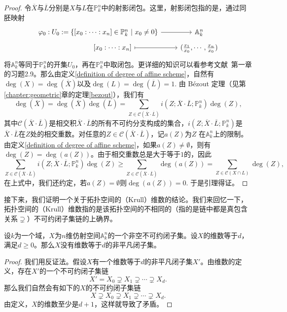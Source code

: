 \begin{proof}
令$\overline{X}$与$\overline{L}$分别是$X$与$L$在$\mathbb{P}^n_k$中的射影闭包。这里，射影闭包指的是，通过同胚映射
\[
\begin{tikzcd}[row sep = tiny]
\varphi_0: U_0 := \left\{ [x_0:\cdots:x_n] \in \mathbb{P}^n_k \ \middle|\ x_0\neq 0 \right\} \arrow[r] & \mathbb{A}^n_k \\
\phantom{hehehehe} [x_0:\cdots:x_n] \arrow[r, mapsto] & (\frac{x_1}{x_0},\cdots,\frac{x_n}{x_0})
\end{tikzcd}
\]
将$\mathbb{A}^n_k$等同于$\mathbb{P}^n_k$的开集$U_0$，再在$\mathbb{P}^n_k$中取闭包。更详细的知识可以看参考文献~第一章的习题2.9。那么由定义\ref{definition of degree of affine scheme}，自然有$\deg(X) = \deg(\overline{X})$以及$\deg(L) = \deg(\overline{L}) = 1.$ 由 B\'ezout 定理（见第\ref{chapter:geometric}章的定理\ref{bezout}），我们有
\begin{equation}
\deg(\overline{X}) = \deg(\overline{X}) \deg(\overline{L}) = \sum_{Z\in\mathcal{C}(\overline{X}\cdot\overline{L})} i(Z; \overline{X}\cdot\overline{L}; \mathbb{P}^n_k)\deg(Z),
\end{equation}
其中$\mathcal{C}(\overline{X}\cdot\overline{L})$是相交积$\overline{X}\cdot\overline{L}$的所有不可约分支构成的集合，$i(Z; \overline{X}\cdot\overline{L}; \mathbb{P}^n_k)$是$\overline{X}\cdot\overline{L}$在$Z$处的相交重数。对任意的$Z\in\mathcal{C}(\overline{X}\cdot\overline{L})$，记$a(Z)$为$Z$ 在$\mathbb{A}^n_k$上的限制。由定义\ref{definition of degree of affine scheme}，如果$a(Z)\neq\emptyset$，则有$\deg(Z) = \deg(a(Z))$。由于相交重数总是大于等于$1$的，因此
\begin{equation}
\sum_{Z\in\mathcal{C}(\overline{X}\cdot\overline{L})} i(Z; \overline{X}\cdot\overline{L}; \mathbb{P}_k^n) \deg(Z) \geqslant \sum_{Z\in\mathcal{C}(\overline{X}\cdot\overline{L})} \deg(a(Z)) = \sum_{Z\in\mathcal{C}(X\cap L)}\deg(Z),
\end{equation}
在上式中，我们还约定，若$a(Z) = \emptyset$则$\deg(a(Z)) = 0.$ 于是引理得证。
\end{proof}

接下来，我们证明一个关于拓扑空间的（Krull）维数的结论。我们来回忆一下，拓扑空间的（Krull）维数指的是该拓扑空间的不相同的（指的是链中都是真包含关系$\supsetneq$）不可约闭子集链的上确界。

\begin{lemma} \label{irreudicible closed subset}
设$k$为一个域，$X$为$n$维仿射空间$\mathbb{A}^n_k$的一个非空不可约闭子集。设$X$的维数等于$d$，满足$d \geqslant 0$。那么$X$没有维数等于$d$的非平凡闭子集。
\end{lemma}
\begin{proof}
我们用反证法。假设$X$有一个维数等于$d$的非平凡闭子集$X'$。由维数的定义，存在$X'$的一个不可约闭子集链
\begin{equation}
X' = X_0 \supsetneq X_1 \supsetneq \cdots \supsetneq X_d.
\end{equation}
那么我们自然会有如下的$X$的不可约闭子集链
\begin{equation}
X \supsetneq X_0 \supsetneq X_1 \supsetneq \cdots \supsetneq X_d.
\end{equation}
由定义，$X$的维数至少是$d+1$，这样就导致了矛盾。
\end{proof}

